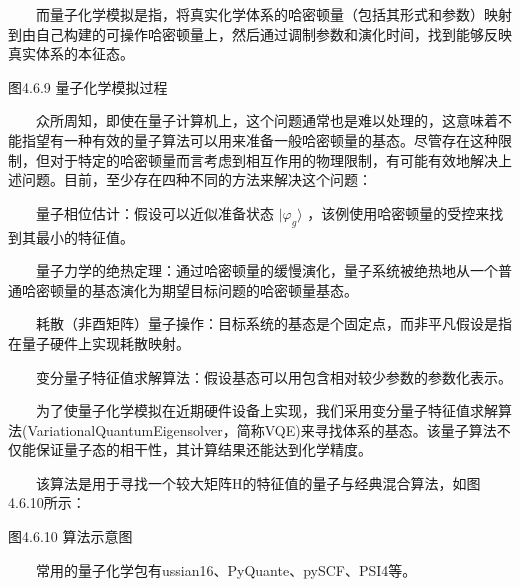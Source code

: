 \documentclass[a4paper,11pt,english]{sphinxmanual}
\begin{document}
\sphinxAtStartPar
  而量子化学模拟是指，将真实化学体系的哈密顿量（包括其形式和参数）映射到由自己构建的可操作哈密顿量上，然后通过调制参数和演化时间，找到能够反映真实体系的本征态。


\begin{center}图4.6.9 量子化学模拟过程
\end{center}
\sphinxAtStartPar
  众所周知，即使在量子计算机上，这个问题通常也是难以处理的，这意味着不能指望有一种有效的量子算法可以用来准备一般哈密顿量的基态。尽管存在这种限制，但对于特定的哈密顿量而言考虑到相互作用的物理限制，有可能有效地解决上述问题。目前，至少存在四种不同的方法来解决这个问题：

\sphinxAtStartPar
​  量子相位估计：假设可以近似准备状态 \(| \varphi_g \rangle\) ，该例使用哈密顿量的受控来找到其最小的特征值。

\sphinxAtStartPar
​  量子力学的绝热定理：通过哈密顿量的缓慢演化，量子系统被绝热地从一个普通哈密顿量的基态演化为期望目标问题的哈密顿量基态。

\sphinxAtStartPar
​  耗散（非酉矩阵）量子操作：目标系统的基态是个固定点，而非平凡假设是指在量子硬件上实现耗散映射。

\sphinxAtStartPar
​  变分量子特征值求解算法：假设基态可以用包含相对较少参数的参数化表示。

\sphinxAtStartPar
  为了使量子化学模拟在近期硬件设备上实现，我们采用变分量子特征值求解算法(Variational\sphinxhyphen{}Quantum\sphinxhyphen{}Eigensolver，简称VQE)来寻找体系的基态。该量子算法不仅能保证量子态的相干性，其计算结果还能达到化学精度。

\sphinxAtStartPar
  该算法是用于寻找一个较大矩阵H的特征值的量子与经典混合算法，如图4.6.10所示：


\begin{center}图4.6.10 算法示意图
\end{center}
\sphinxAtStartPar
{}

\sphinxAtStartPar
  常用的量子化学包有ussian16、PyQuante、pySCF、PSI4等。

\end{document}
